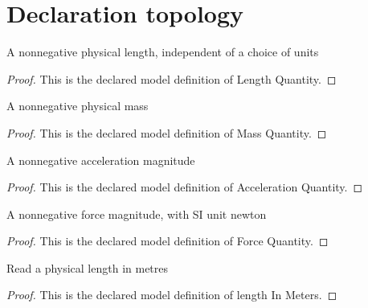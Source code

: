 \section{Declaration topology}
\begin{definition}
  \label{def:physics:phyx-mini-0381:phyxminiproblems-problemphyxmini0381-lengthquantity}
  A nonnegative physical length, independent of a choice of units
\end{definition}
\begin{proof}
  This is the declared model definition of Length Quantity.
\end{proof}
\begin{definition}
  \label{def:physics:phyx-mini-0381:phyxminiproblems-problemphyxmini0381-massquantity}
  A nonnegative physical mass
\end{definition}
\begin{proof}
  This is the declared model definition of Mass Quantity.
\end{proof}
\begin{definition}
  \label{def:physics:phyx-mini-0381:phyxminiproblems-problemphyxmini0381-accelerationquantity}
  A nonnegative acceleration magnitude
\end{definition}
\begin{proof}
  This is the declared model definition of Acceleration Quantity.
\end{proof}
\begin{definition}
  \label{def:physics:phyx-mini-0381:phyxminiproblems-problemphyxmini0381-forcequantity}
  A nonnegative force magnitude, with SI unit newton
\end{definition}
\begin{proof}
  This is the declared model definition of Force Quantity.
\end{proof}
\begin{definition}
  \label{def:physics:phyx-mini-0381:phyxminiproblems-problemphyxmini0381-lengthinmeters}
  Read a physical length in metres
\end{definition}
\begin{proof}
  This is the declared model definition of length In Meters.
\end{proof}

